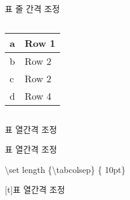 \documentclass[ aspectratio=149,  14pt,blue,xcolor=pdftex,dvipsnames,table,handout,notes]{beamer}
\begin{document}
\begin{frame}[t]{표 줄 간격 조정}
\begin{columns}[t]
\begin{column}{0.3\textwidth}
		\begin{tabular}{|l|l|}
		\hline
		a & Row 1 \bigstrut \\ \hline
		b & Row 2 \bigstrut \\ \hline
		c & Row 2 \bigstrut[t] \\ \hline
		d & Row 4 \bigstrut[b] \\ \hline
		\end{tabular}



		\end{column}
		\end{columns}


		\end{frame}

		\begin{frame}[t]{표 열간격 조정}

		\begin{block}{표 열간격 조정}
		\begin{description}[12345678901234567890]
		\item[top col sep] 		\textbackslash set length \{\textbackslash tabcolsep\} \{ 10pt\}
		\end{description}
		\end{block}



		\end{frame}[t]{표 열간격 조정}
\end{document}
